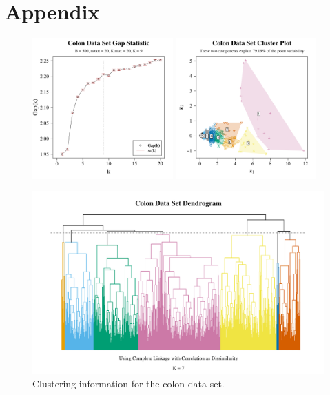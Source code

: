 \documentclass[10pt]{article}
\begin{document}
\newpage

\section{Appendix} %

\begin{figure}[ht]
\centering
\includegraphics[width = 0.48\textwidth]{colon_gap_stat.pdf}
\includegraphics[width = 0.48\textwidth]{colon_clus_plot.pdf}

\includegraphics[width = \textwidth]{colon_den.pdf}
\caption{Clustering information for the colon data set.}
\label{colonclus}
\end{figure}
\end{document}
